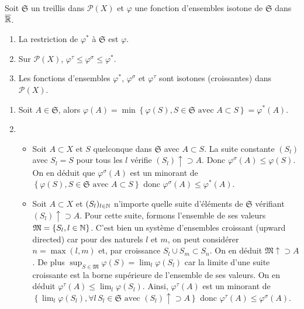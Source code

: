 \begin{prop}
Soit $\mathfrak{S}$ un treillis dans $\mathcal{P}(X)$ et $\varphi$ une fonction d'ensembles isotone de $\mathfrak{S}$ dans $\overline{\mathbb{R}}$.
 \begin{enumerate}
  \item  La restriction de $\varphi^*$ à $\mathfrak{S}$ est $\varphi$.
  \item Sur $\mathcal{P}(X)$, $\varphi^\tau \leq \varphi^\sigma \leq \varphi^*$.
  \item Les fonctions d'ensembles $\varphi^*$, $\varphi^\sigma$ et $\varphi^\tau$ sont isotones (croissantes) dans $\mathcal{P}(X)$.
 \end{enumerate}
\end{prop}
\begin{demo}
 \begin{enumerate}
  \item Soit $A \in \mathfrak{S}$, alors $\varphi(A)= \min \left\lbrace \varphi(S), S \in \mathfrak{S} \text{ avec } A \subset S \right\rbrace = \varphi^*(A)$.
  \item \begin{itemize}
         \item Soit $A \subset X$ et $S$ quelconque dans $\mathfrak{S}$ avec $A \subset S$. La suite constante $(S_l)$ avec $S_l = S$ pour tous les $l$ vérifie $(S_l) \uparrow \supset A$. Donc $\varphi^\sigma(A) \leq \varphi(S)$. On en déduit que $\varphi^\sigma(A)$ est un minorant de $\left\lbrace \varphi(S), S \in \mathfrak{S} \text{ avec } A \subset S \right\rbrace$ donc $\varphi^\sigma(A) \leq \varphi^*(A)$.
        \item Soit $A \subset X$ et $(S_l)_{l\in \mathbb{N}}$ n'importe quelle suite d'éléments de $\mathfrak{S}$ vérifiant $(S_l) \uparrow \supset A$. Pour cette suite, formons l'ensemble de ses valeurs $\mathfrak{M}= \left\lbrace S_l, l\in \mathbb{N} \right\rbrace$. C'est bien un système d'ensembles croissant (upward directed) car pour des naturels $l$ et $m$, on peut considérer $n = \max(l,m)$ et, par croissance $S_l \cup S_m \subset S_n$. On en déduit $\mathfrak{M}\uparrow \supset A$. De plus $\sup_{S \in \mathfrak{M}} \varphi(S)=\lim_{l}  \varphi(S_l)$ car la limite d'une suite croissante est la borne supérieure de l'ensemble de ses valeurs. On en déduit $\varphi^\tau (A) \leq \lim_{l}  \varphi(S_l)$. Ainsi, $\varphi^\tau(A)$ est un minorant de $\left\lbrace \lim_{l}  \varphi(S_l), \forall l \, S_l\in \mathfrak{S} \text{ avec } (S_l) \uparrow \supset A \right\rbrace$ donc $\varphi^\tau(A) \leq \varphi^\sigma(A)$.
        \end{itemize}

\end{enumerate}
\end{demo}
